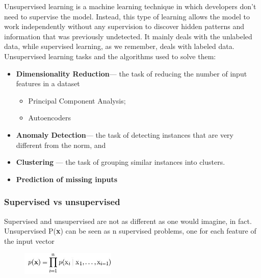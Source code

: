 \begin{tcolorbox}[width=\textwidth,colback={white},title={\textbf{23.} Can you make some examples of unsupervised algorithms ?
	},colbacktitle=red,coltitle=black]
	
	Unsupervised learning is a machine learning technique in which developers don’t need to supervise the model. Instead, this type of learning allows the model to work independently without any supervision to discover hidden patterns and information that was previously undetected. It mainly deals with the unlabeled data, while supervised learning, as we remember, deals with labeled data.
	Unsupervised learning tasks and the algorithms used to solve them:
	
	\begin{itemize}
		\item \textbf{Dimensionality Reduction}— the task of reducing the number of input features in a dataset
		\begin{itemize}
			\item Principal Component Analysis;
			\item Autoencoders
		\end{itemize}
		\item \textbf{Anomaly Detection}— the task of detecting instances that are very different from the norm, and
		
		\item \textbf{Clustering} — the task of grouping similar instances into clusters.
		
		\item \textbf{Prediction of missing inputs
		}
	\end{itemize}
	 
\end{tcolorbox}

\subsubsection{Supervised vs unsupervised}


Supervised and unsupervised are not as different as one would imagine, in fact.\\
Unsupervised P(\textbf{x}) can be seen as n supervised problems, one for each feature of the input vector

\begin{figure}[ht]
	\centering
	\includegraphics[width=0.4\textwidth]{figure_ml/s_vs_u.png}
\end{figure}
\FloatBarrier

